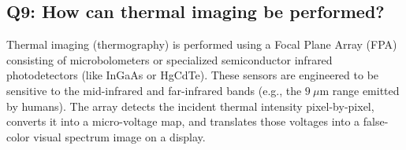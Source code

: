 \documentclass[a4paper,11pt]{article}
\begin{document}
\subsection*{Q9: How can thermal imaging be performed?}
Thermal imaging (thermography) is performed using a Focal Plane Array (FPA) consisting of microbolometers or specialized semiconductor infrared photodetectors (like InGaAs or HgCdTe). These sensors are engineered to be sensitive to the mid-infrared and far-infrared bands (e.g., the $9\ \mu\text{m}$ range emitted by humans). The array detects the incident thermal intensity pixel-by-pixel, converts it into a micro-voltage map, and translates those voltages into a false-color visual spectrum image on a display.
\end{document}
